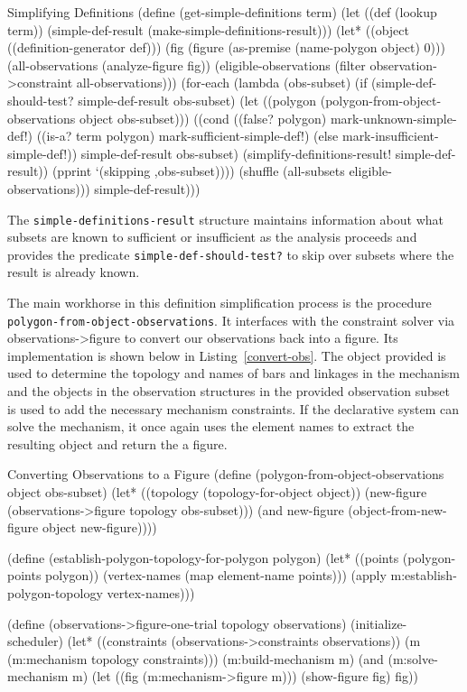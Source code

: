 \begin{code-listing}
[label=simple-def]
{Simplifying Definitions}
(define (get-simple-definitions term)
  (let ((def (lookup term))
        (simple-def-result (make-simple-definitions-result)))
    (let* ((object ((definition-generator def)))
           (fig (figure (as-premise (name-polygon object) 0)))
           (all-observations (analyze-figure fig))
           (eligible-observations
            (filter observation->constraint all-observations)))
      (for-each
       (lambda (obs-subset)
         (if (simple-def-should-test? simple-def-result obs-subset)
             (let ((polygon
                    (polygon-from-object-observations object obs-subset)))
               ((cond ((false? polygon) mark-unknown-simple-def!)
                      ((is-a? term polygon) mark-sufficient-simple-def!)
                      (else mark-insufficient-simple-def!))
                simple-def-result obs-subset)
               (simplify-definitions-result! simple-def-result))
             (pprint `(skipping ,obs-subset))))
       (shuffle (all-subsets eligible-observations)))
      simple-def-result)))
\end{code-listing}

The \texttt{simple-definitions-result} structure maintains information
about what subsets are known to sufficient or insufficient as the
analysis proceeds and provides the predicate
\texttt{simple-def-should-test?} to skip over subsets where the result
is already known.

The main workhorse in this definition simplification process is the
procedure \texttt{polygon-from-object-observations}. It interfaces
with the constraint solver via observations->figure to convert our
observations back into a figure. Its implementation is shown below in
Listing~\ref{convert-obs}. The object provided is used to determine
the topology and names of bars and linkages in the mechanism and the
objects in the observation structures in the provided observation
subset is used to add the necessary mechanism constraints. If the
declarative system can solve the mechanism, it once again uses the
element names to extract the resulting object and return the a figure.

\begin{code-listing}
[label=convert-obs]
{Converting Observations to a Figure}
(define (polygon-from-object-observations object obs-subset)
  (let* ((topology (topology-for-object object))
         (new-figure (observations->figure topology obs-subset)))
    (and new-figure (object-from-new-figure object new-figure))))

(define (establish-polygon-topology-for-polygon polygon)
  (let* ((points (polygon-points polygon))
         (vertex-names (map element-name points)))
    (apply m:establish-polygon-topology vertex-names)))

(define (observations->figure-one-trial topology observations)
  (initialize-scheduler)
  (let* ((constraints (observations->constraints observations))
         (m (m:mechanism topology constraints)))
    (m:build-mechanism m)
    (and (m:solve-mechanism m)
         (let ((fig (m:mechanism->figure m)))
           (show-figure fig)
           fig))
\end{code-listing}

